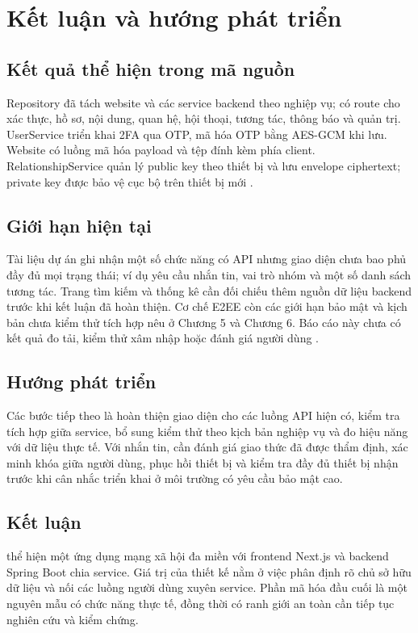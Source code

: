 \chapter{Kết luận và hướng phát triển}\label{chap:danh-gia}
\section{Kết quả thể hiện trong mã nguồn}
Repository đã tách website và các service backend theo nghiệp vụ; có route cho xác thực, hồ sơ, nội dung, quan hệ, hội thoại, tương tác, thông báo và quản trị. UserService triển khai 2FA qua OTP, mã hóa OTP bằng AES-GCM khi lưu. Website có luồng mã hóa payload và tệp đính kèm phía client. RelationshipService quản lý public key theo thiết bị và lưu envelope ciphertext; private key được bảo vệ cục bộ trên thiết bị mới \cite{readme,architecture,e2ee}.

\section{Giới hạn hiện tại}
Tài liệu dự án ghi nhận một số chức năng có API nhưng giao diện chưa bao phủ đầy đủ mọi trạng thái; ví dụ yêu cầu nhắn tin, vai trò nhóm và một số danh sách tương tác. Trang tìm kiếm và thống kê cần đối chiếu thêm nguồn dữ liệu backend trước khi kết luận đã hoàn thiện. Cơ chế E2EE còn các giới hạn bảo mật và kịch bản chưa kiểm thử tích hợp nêu ở Chương 5 và Chương 6. Báo cáo này chưa có kết quả đo tải, kiểm thử xâm nhập hoặc đánh giá người dùng \cite{usecases,architecture}.

\section{Hướng phát triển}
Các bước tiếp theo là hoàn thiện giao diện cho các luồng API hiện có, kiểm tra tích hợp giữa service, bổ sung kiểm thử theo kịch bản nghiệp vụ và đo hiệu năng với dữ liệu thực tế. Với nhắn tin, cần đánh giá giao thức đã được thẩm định, xác minh khóa giữa người dùng, phục hồi thiết bị và kiểm tra đầy đủ thiết bị nhận trước khi cân nhắc triển khai ở môi trường có yêu cầu bảo mật cao.

\section{Kết luận}
\project{} thể hiện một ứng dụng mạng xã hội đa miền với frontend Next.js và backend Spring Boot chia service. Giá trị của thiết kế nằm ở việc phân định rõ chủ sở hữu dữ liệu và nối các luồng người dùng xuyên service. Phần mã hóa đầu cuối là một nguyên mẫu có chức năng thực tế, đồng thời có ranh giới an toàn cần tiếp tục nghiên cứu và kiểm chứng.
